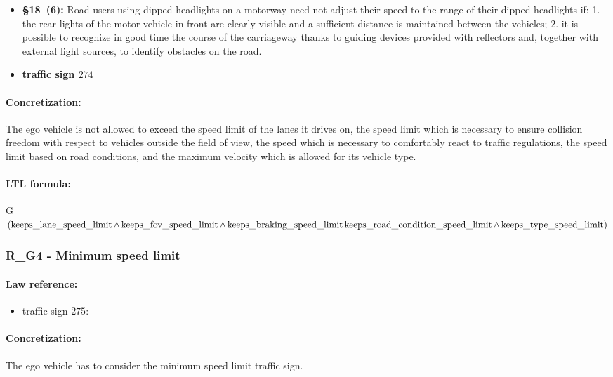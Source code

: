 \begin{itemize}
	\item \textbf{\stvo \S 18~(6):} Road users using dipped headlights on a motorway need not adjust their speed to the range of their dipped headlights if: 1. the rear lights of the motor vehicle in front are clearly visible and a sufficient distance is maintained between the vehicles; 2. it is possible to recognize in good time the course of the carriageway thanks to guiding devices provided with reflectors and, together with external light sources, to identify obstacles on the road.
	
	\item \textbf{traffic sign $274$}
\end{itemize}

\paragraph{Concretization:} The ego vehicle is not allowed to exceed the speed limit of the lanes it drives on, the speed limit which is necessary to ensure collision freedom with respect to vehicles outside the field of view, the speed which is necessary to comfortably react to traffic regulations, the speed limit based on road conditions, and the maximum velocity which is allowed for its vehicle type.

\paragraph{LTL formula:} G$(\operatorname*{keeps\_lane\_speed\_limit}  \land \operatorname*{keeps\_fov\_speed\_limit} \land \\ \operatorname*{keeps\_braking\_speed\_limit} \operatorname*{keeps\_road\_condition\_speed\_limit} \land \operatorname*{keeps\_type\_speed\_limit}) $

\subsubsection{R\_G4 - Minimum speed limit}
\paragraph{Law reference:}
\begin{itemize}
	\item \stvo traffic sign $275$:
\end{itemize}
\paragraph{Concretization:} The ego vehicle has to consider the minimum speed limit traffic sign.
